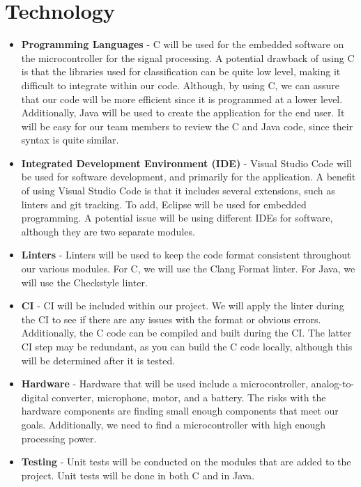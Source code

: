 \documentclass{article}
\begin{document}
\section{Technology}

\begin{itemize}
	\item \textbf{Programming Languages} - C will be used for the embedded software on the microcontroller for the signal processing. A potential drawback of using C is that the libraries used for classification can be quite low level, making it difficult to integrate within our code. Although, by using C, we can assure that our code will be more efficient since it is programmed at a lower level. Additionally, Java will be used to create the application for the end user. It will be easy for our team members to review the C and Java code, since their syntax is quite similar.
	\item \textbf{Integrated Development Environment (IDE)} - Visual Studio Code will be used for software development, and primarily for the application. A benefit of using Visual Studio Code is that it includes several extensions, such as linters and git tracking. To add, Eclipse will be used for embedded programming. A potential issue will be using different IDEs for software, although they are two separate modules.
	\item \textbf{Linters} - Linters will be used to keep the code format consistent throughout our various modules. For C, we will use the Clang Format linter. For Java, we will use the Checkstyle linter.
	\item \textbf{CI} - CI will be included within our project. We will apply the linter during the CI to see if there are any issues with the format or obvious errors. Additionally, the C code can be compiled and built during the CI. The latter CI step may be redundant, as you can build the C code locally, although this will be determined after it is tested.
	\item \textbf{Hardware} - Hardware that will be used include a microcontroller, analog-to-digital converter, microphone, motor, and a battery. The risks with the hardware components are finding small enough components that meet our goals. Additionally, we need to find a microcontroller with high enough processing power.
	\item \textbf{Testing} - Unit tests will be conducted on the modules that are added to the project. Unit tests will be done in both C and in Java.
\end{itemize}
\end{document}
